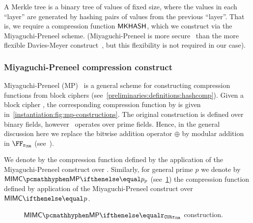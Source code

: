 A Merkle tree is a binary tree of values of fixed size, where the values in each ``layer'' are generated by hashing pairs of values from the previous ``layer''. That is, we require a compression function $\mathsf{MKHASH}$, which we construct via the Miyaguchi-Preneel scheme. (Miyaguchi-Preneel is more secure~\cite[$f_5$ function]{black2002black} than the more flexible Davies-Meyer construct~\cite[Section 3]{gazzoni2006maelstrom}, but this flexibility is not required in our case).

\subsubsection{Miyaguchi-Preneel compression construct}

Miyaguchi-Preneel (MP)~\cite[$f_3$ function]{black2002black} is a general scheme for constructing compression functions from block ciphers (see~\cref{preliminaries:definitions:hashcomp}). Given a block cipher \Enc, the corresponding compression function by \fMP{} is given in~\cref{instantiation:fig:mp-constructions}. The original construction is defined over binary fields, however \zeth~operates over prime fields. Hence, in the general discussion here we replace the bitwise addition operator $\oplus$ by modular addition in $\FFx{\rCURVE}$ (see~\cite{mp-security-ethsnarks}).

We denote by \mimcMP{} the compression function defined by the application of the Miyaguchi-Preneel construct over \mimc{}. Similarly, for general prime $p$ we denote by $\mimcMPPrime{p}$ (see~\cref{instantiation:fig:mimc-mp-constructions}) the compression function defined by application of the Miyaguchi-Preneel construct over $\mimcPrime{p}$.

\begin{figure*}[ht]
    \begin{minipage}[t]{0.50\textwidth}
        \caption{\MP{} construct in $\FFx{\rCURVE}$.}\label{instantiation:fig:mp-constructions}
    \end{minipage}%
    \begin{minipage}[t]{0.50\textwidth}
    \caption{$\mimcMPPrime{\rCURVE}$ construction.}\label{instantiation:fig:mimc-mp-constructions}
    \end{minipage}%
\end{figure*}

